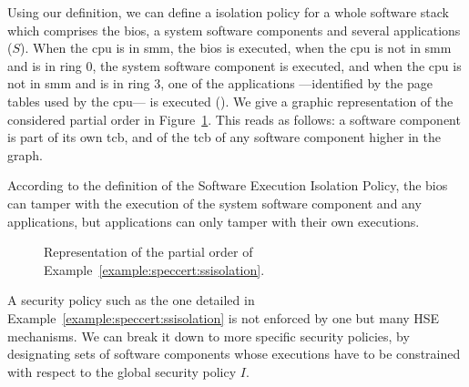 \begin{example}
  \label{example:speccert:ssisolation}
  Using our definition, we can define a isolation policy for a whole software
  stack which comprises the \ac{bios}, a system software components and several
  applications ($S$).
  When the \ac{cpu} is in \ac{smm}, the \ac{bios} is executed, when the \ac{cpu}
  is not in \ac{smm} and is in ring 0, the system software component is
  executed, and when the \ac{cpu} is not in \ac{smm} and is in ring 3, one of
  the applications ---identified by the page tables used by the \ac{cpu}--- is
  executed ().
  We give a graphic representation of the considered partial order in
  Figure~\ref{fig:speccert:partialorder}.
  This reads as follows: a software component is part of its own \ac{tcb}, and
  of the \ac{tcb} of any software component higher in the graph.

  According to the definition of the Software Execution Isolation Policy, the
  \ac{bios} can tamper with the execution of the system software component and
  any applications, but applications can only tamper with their own executions.
\end{example}

\begin{figure}
  \begin{center}
  \end{center}
  \caption{Representation of the partial order of
    Example~\ref{example:speccert:ssisolation}.}
  \label{fig:speccert:partialorder}
\end{figure}

A security policy such as the one detailed in
Example~\ref{example:speccert:ssisolation} is not enforced by one but many HSE
mechanisms.
%
We can break it down to more specific security policies, by designating sets of
software components whose executions have to be constrained with respect to the
global security policy $I$.

